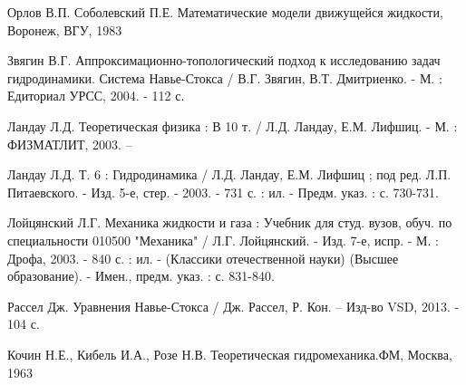 \begin{thebibliography}{99}

Орлов В.П. Соболевский П.Е. Математические модели движущейся жидкости, Воронеж, ВГУ, 1983

Звягин В.Г. Аппроксимационно-топологический подход к исследованию задач гидродинамики. Система Навье-Стокса / В.Г. Звягин, В.Т. Дмитриенко. - М. : Едиториал УРСС, 2004. - 112 с.

Ландау Л.Д. Теоретическая физика : В 10 т. / Л.Д. Ландау, Е.М. Лифшиц. - М. : ФИЗМАТЛИТ, 2003. –

Ландау Л.Д. Т. 6 : Гидродинамика / Л.Д. Ландау, Е.М. Лифшиц ; под ред. Л.П. Питаевского. - Изд. 5-е, стер. - 2003. - 731 с. : ил. - Предм. указ. : с. 730-731.

Лойцянский Л.Г. Механика жидкости и газа : Учебник для студ. вузов, обуч. по специальности 010500 "Механика" / Л.Г. Лойцянский. - Изд. 7-е, испр. - М. : Дрофа, 2003. - 840 с. : ил. - (Классики отечественной науки) (Высшее образование). - Имен., предм. указ. : с. 831-840.

Рассел Дж. Уравнения Навье-Стокса / Дж. Рассел, Р. Кон. – Изд-во VSD, 2013. - 104 с.

Кочин Н.Е., Кибель И.А., Розе Н.В. Теоретическая гидромеханика.ФМ, Москва, 1963

\end{thebibliography}
